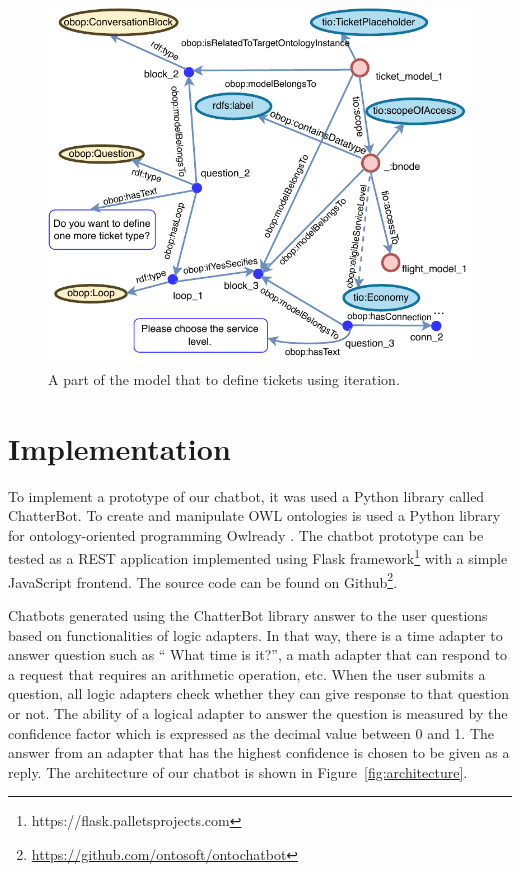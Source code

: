 \documentclass[runningheads]{llncs}
\begin{document}
\begin{figure}[H]
  \centering
  \includegraphics[width=\linewidth]{img/iteration_example}
  \caption{A part of the model that to define tickets using iteration.}
  \label{fig:iteration_example}
\end{figure}


\FloatBarrier 
\section {Implementation}

To implement a prototype of our chatbot, it was used a Python library called ChatterBot. To create and manipulate OWL ontologies is used a Python library for ontology-oriented programming Owlready \cite{lamy2017owlready}. The chatbot prototype can be tested as a REST application implemented using Flask framework\footnote{\label{flaskfootnote}https://flask.palletsprojects.com} with a simple JavaScript frontend. The source code can be found on Github\footnote{\url{https://github.com/ontosoft/ontochatbot}}. 

Chatbots generated using the ChatterBot library answer to the user questions based on functionalities of logic adapters. In that way, there is a time adapter to answer question such as `` What time is it?'', a math adapter that can respond to a request that requires an arithmetic operation, etc. When the user submits a question, all logic adapters check whether they can give response to that question or not. The ability of a logical adapter to answer the question is measured by the confidence factor which is expressed as the decimal value between 0 and 1. The answer from an adapter that has the highest confidence is chosen to be given as a reply. The architecture of our chatbot is shown in Figure~\ref{fig:architecture}.
\end{document}

